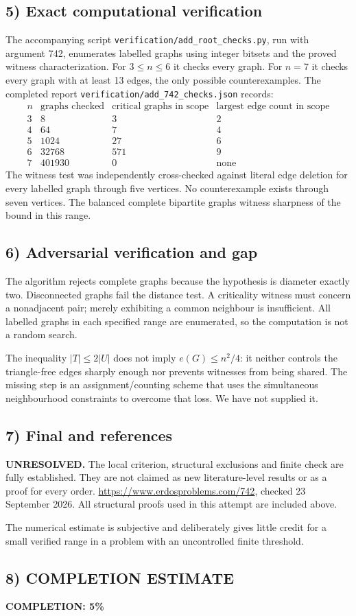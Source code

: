 \subsection*{5) Exact computational verification}
The accompanying script \texttt{verification/add\_root\_checks.py}, run with argument 742, enumerates labelled graphs using integer bitsets and the proved witness characterization. For $3\leq n\leq6$ it checks every graph. For $n=7$ it checks every graph with at least 13 edges, the only possible counterexamples. The completed report \texttt{verification/add\_742\_checks.json} records:
\[
\begin{array}{c|r|r|r}
n&\text{graphs checked}&\text{critical graphs in scope}&\text{largest edge count in scope}\\
3&8&3&2\\
4&64&7&4\\
5&1024&27&6\\
6&32768&571&9\\
7&401930&0&\text{none}
\end{array}
\]
The witness test was independently cross-checked against literal edge deletion for every labelled graph through five vertices. No counterexample exists through seven vertices. The balanced complete bipartite graphs witness sharpness of the bound in this range.

\subsection*{6) Adversarial verification and gap}
The algorithm rejects complete graphs because the hypothesis is diameter exactly two. Disconnected graphs fail the distance test. A criticality witness must concern a nonadjacent pair; merely exhibiting a common neighbour is insufficient. All labelled graphs in each specified range are enumerated, so the computation is not a random search.

The inequality $|T|\leq2|U|$ does not imply $e(G)\leq n^2/4$: it neither controls the triangle-free edges sharply enough nor prevents witnesses from being shared. The missing step is an assignment/counting scheme that uses the simultaneous neighbourhood constraints to overcome that loss. We have not supplied it.

\subsection*{7) Final and references}
\textbf{UNRESOLVED.} The local criterion, structural exclusions and finite check are fully established. They are not claimed as new literature-level results or as a proof for every order.
\url{https://www.erdosproblems.com/742}, checked 23 September 2026. All structural proofs used in this attempt are included above.

The numerical estimate is subjective and deliberately gives little credit for a small verified range in a problem with an uncontrolled finite threshold.
\subsection*{8) COMPLETION ESTIMATE}
\textbf{COMPLETION: 5\%}
